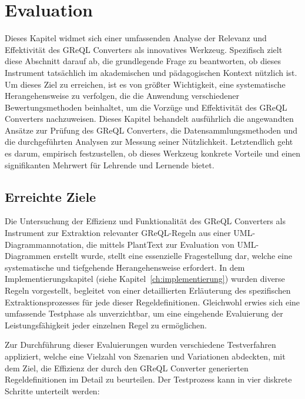 \chapter{Evaluation}

Dieses Kapitel widmet sich einer umfassenden Analyse der Relevanz und Effektivität des GReQL Converters als innovatives
Werkzeug. Spezifisch zielt diese Abschnitt darauf ab, die grundlegende Frage zu beantworten, ob dieses Instrument
tatsächlich im akademischen und pädagogischen Kontext nützlich ist. Um dieses Ziel zu erreichen, ist es von größter
Wichtigkeit, eine systematische Herangehensweise zu verfolgen, die die Anwendung verschiedener Bewertungsmethoden
beinhaltet, um die Vorzüge und Effektivität des GReQL Converters nachzuweisen. Dieses Kapitel behandelt ausführlich die
angewandten Ansätze zur Prüfung des GReQL Converters, die Datensammlungsmethoden und die durchgeführten Analysen zur
Messung seiner Nützlichkeit. Letztendlich geht es darum, empirisch festzustellen, ob dieses Werkzeug konkrete Vorteile
und einen signifikanten Mehrwert für Lehrende und Lernende bietet.

\section{Erreichte Ziele}\label{sec:erreichte-ziele}

Die Untersuchung der Effizienz und Funktionalität des GReQL Converters als Instrument zur Extraktion relevanter
GReQL-Regeln aus einer UML-Diagrammannotation, die mittels PlantText zur Evaluation von UML-Diagrammen erstellt wurde,
stellt eine essenzielle Fragestellung dar, welche eine systematische und tiefgehende Herangehensweise erfordert. In dem
Implementierungskapitel (siehe Kapitel~\ref{ch:implementierung}) wurden diverse Regeln vorgestellt, begleitet von einer detaillierten Erläuterung des
spezifischen Extraktionsprozesses für jede dieser Regeldefinitionen. Gleichwohl erwies sich eine umfassende Testphase
als unverzichtbar, um eine eingehende Evaluierung der Leistungsfähigkeit jeder einzelnen Regel zu ermöglichen.

Zur Durchführung dieser Evaluierungen wurden verschiedene Testverfahren appliziert, welche eine Vielzahl von Szenarien
und Variationen abdeckten, mit dem Ziel, die Effizienz der durch den GReQL Converter generierten Regeldefinitionen
im Detail zu beurteilen. Der Testprozess kann in vier diskrete Schritte unterteilt werden:

